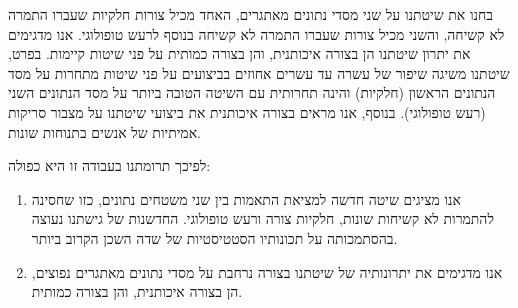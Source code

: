 בחנו את שיטתנו על שני מסדי נתונים מאתגרים, האחד מכיל צורות חלקיות שעברו התמרה לא קשיחה, והשני מכיל צורות שעברו התמרה לא קשיחה בנוסף לרעש טופולוגי. אנו מדגימים את יתרון שיטתנו הן בצורה איכותנית, והן בצורה כמותית על פני שיטות קיימות. בפרט, שיטתנו משיגה שיפור של עשרה עד עשרים אחוזים בביצועים על פני שיטות מתחרות על מסד הנתונים הראשון (חלקיות) והינה תחרותית עם השיטה הטובה ביותר על מסד הנתונים השני (רעש טופולוגי). בנוסף, אנו מראים בצורה איכותנית את ביצועי שיטתנו על מצבור סריקות אמיתיות של אנשים בתנוחות שונות.

לפיכך תרומתנו בעבודה זו היא כפולה:
\begin{enumerate}
\item	אנו מציגים שיטה חדשה למציאת התאמות בין שני משטחים נתונים, כזו שחסינה להתמרות לא קשיחות שונות, חלקיות צורה ורעש טופולוגי. החדשנות של גישתנו נעוצה בהסתמכותה על תכונותיו הסטטיסטיות של שדה השכן הקרוב ביותר.
\item	אנו מדגימים את יתרונותיה של שיטתנו בצורה נרחבת על מסדי נתונים מאתגרים נפוצים, הן בצורה איכותנית, והן בצורה כמותית.
\end{enumerate}
